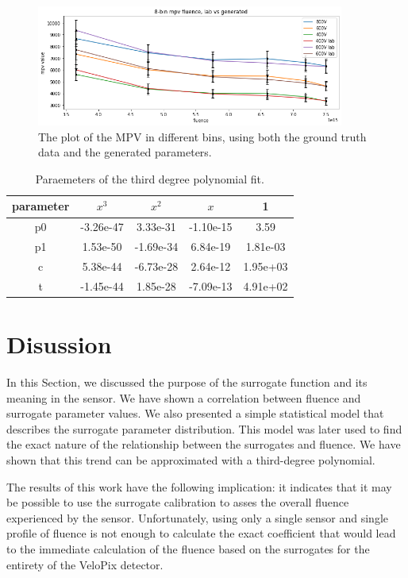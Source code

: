 \begin{figure}[H]
\centering
\includegraphics[width=0.9\textwidth]{figures/chapter4/surrogates/mpv_vs_fluence.png}
\caption{The plot of the MPV in different bins, using both the ground truth data and the generated parameters.}
\label{fig:mpv_vs_fluence}
\end{figure}
\begin{table}[h]
\begin{center}
\begin{tabular}{ |c|c|c|c|c| }
\hline
parameter & $x^3$ &$x^2$ & $x$ & 1\\
\hline
p0 & -3.26e-47 & 3.33e-31 & -1.10e-15 & 3.59 \\
p1 &  1.53e-50 & -1.69e-34 & 6.84e-19 & 1.81e-03\\
c & 5.38e-44 & -6.73e-28 & 2.64e-12 & 1.95e+03\\
t & -1.45e-44 & 1.85e-28 & -7.09e-13 & 4.91e+02\\
\hline
\end{tabular}
\caption{\label{tab:fit_parameter} Paraemeters of the third degree polynomial fit.}
\end{center}
\end{table}



\section{Disussion}
In this Section, we discussed the purpose of the surrogate function and its meaning in the sensor.
We have shown a correlation between fluence and surrogate parameter values.
We also presented a simple statistical model that describes the surrogate parameter distribution. This model was later used to find the exact nature of the relationship between the surrogates and fluence.
We have shown that this trend can be approximated with a third-degree polynomial.

The results of this work have the following implication: it indicates that it may be possible to use the surrogate calibration to asses the overall fluence experienced by the sensor.
Unfortunately, using only a single sensor and single profile of fluence is not enough to calculate the exact coefficient that would lead to the immediate calculation of the fluence based on the surrogates for the entirety of the VeloPix detector.


